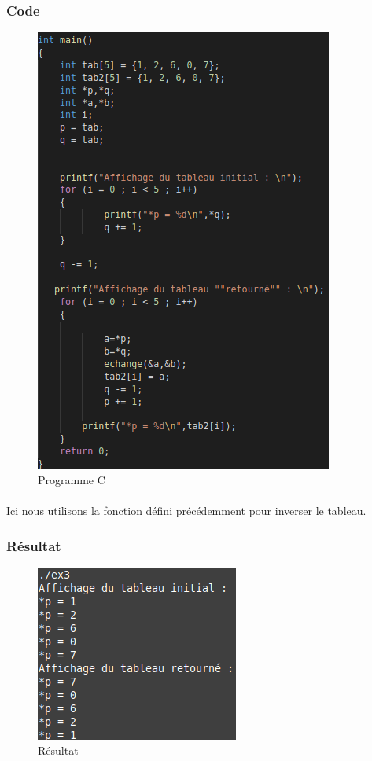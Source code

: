 \documentclass[10pt,a4paper]{article}
\begin{document}
\subsubsection{Code}
\begin{figure}[h]
\begin{center}
\includegraphics[scale=.3]{images/ex3_c}
\end{center}
\caption{Programme C}
\end{figure}
\paragraph{}
Ici nous utilisons la fonction défini précédemment pour inverser le tableau.
\subsubsection{Résultat}
\begin{figure}[h] 
\begin{center}
\includegraphics[scale=.3]{images/ex3_ex}
\end{center}
\caption{Résultat}
\end{figure}
\end{document}
